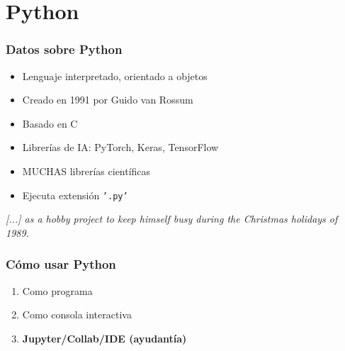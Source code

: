 \documentclass[14pt,aspectratio=169,xcolor=dvipsnames]{beamer}
\begin{document}
\section{Python}
\begin{frame}\frametitle{Datos sobre Python}
    \begin{itemize}
        \item Lenguaje interpretado, orientado a objetos
        \item Creado en 1991 por Guido van Rossum
        \item Basado en C
        \item Librerías de IA: PyTorch, Keras, TensorFlow
        \item MUCHAS librerías científicas
        \item Ejecuta extensión \texttt{'.py'}
    \end{itemize}

\begin{block}{}
    \emph{[...] as a hobby project to keep himself busy during the Christmas holidays of 1989. }
\end{block}
\end{frame}
\begin{frame}\frametitle{Cómo usar Python}
    \begin{enumerate}
        \item<1-> Como programa
        \item<2-> Como consola interactiva
        \item<3-> \textbf{Jupyter/Collab/IDE (ayudantía)}
    \end{enumerate}

\vspace{1cm}
\pause{}
\end{frame}
\end{document}

